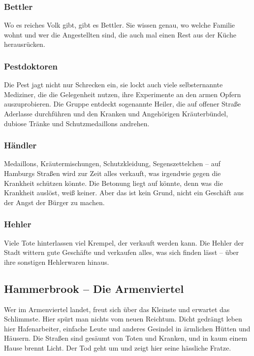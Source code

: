 \subsubsection*{Bettler}
\label{Bettler}

Wo es reiches Volk gibt, gibt es Bettler. Sie wissen genau, wo welche Familie wohnt und wer die Angestellten sind, die auch mal einen Rest aus der Küche herausrücken.

\subsubsection*{Pestdoktoren}
\label{Pestdoktoren}

Die Pest jagt nicht nur Schrecken ein, sie lockt auch viele selbsternannte Mediziner, die die Gelegenheit nutzen, ihre Experimente an den armen Opfern auszuprobieren. Die Gruppe entdeckt sogenannte Heiler, die auf offener Straße Aderlasse durchführen und den Kranken und Angehörigen Kräuterbündel, dubiose Tränke und Schutzmedaillons andrehen.

\subsubsection*{Händler}
\label{Händler}

Medaillons, Kräutermischungen, Schutzkleidung, Segenszettelchen – auf Hamburgs Straßen wird zur Zeit alles verkauft, was irgendwie gegen die Krankheit schützen könnte. Die Betonung liegt auf könnte, denn was die Krankheit auslöst, weiß keiner. Aber das ist kein Grund, nicht ein Geschäft aus der Angst der Bürger zu machen.

\subsubsection*{Hehler}
\label{Hehler}

Viele Tote hinterlassen viel Krempel, der verkauft werden kann. Die Hehler der Stadt wittern gute Geschäfte und verkaufen alles, was sich finden lässt – über ihre sonstigen Hehlerwaren hinaus.


\subsection{Hammerbrook – Die Armenviertel}

Wer im Armenviertel landet, freut sich über das Kleinste und erwartet das Schlimmste. Hier spürt man nichts vom neuen Reichtum. Dicht gedrängt leben hier Hafenarbeiter, einfache Leute und anderes Gesindel in ärmlichen Hütten und Häusern. Die Straßen sind gesäumt von Toten und Kranken, und in kaum einem Hause brennt Licht. Der Tod geht um und zeigt hier seine hässliche Fratze.

